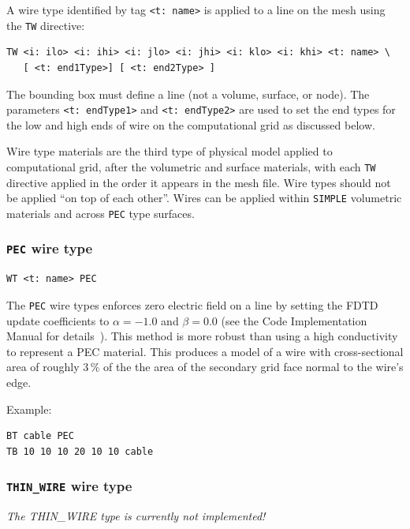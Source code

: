 \documentclass[onecolumn,a4paper]{article}
\numberwithin{equation}{section}
\begin{document}
A wire type identified by tag \texttt{<t:~name>} is applied to a line on the mesh using 
the \texttt{TW} directive:
\begin{verbatim}
TW <i: ilo> <i: ihi> <i: jlo> <i: jhi> <i: klo> <i: khi> <t: name> \
   [ <t: end1Type>] [ <t: end2Type> ]
\end{verbatim}
The bounding box must define a line (not a volume, surface, or node). The parameters 
\texttt{<t:~endType1>} and \texttt{<t:~endType2>} are used to set the end types for the low and 
high ends of wire on the computational grid as discussed below.

Wire type materials are the third type of physical model applied to computational grid, after 
the volumetric and surface materials, with each \texttt{TW} directive applied in the order it appears in 
the mesh file. Wire types should not be applied ``on top of each other''. Wires can be applied within
\texttt{SIMPLE} volumetric materials and across \texttt{PEC} type surfaces. 

\subsubsection{\texttt{PEC} wire type}

\begin{verbatim}
WT <t: name> PEC
\end{verbatim}

The \texttt{PEC} wire types enforces zero electric field on a line
by setting the FDTD update coefficients to $\alpha=-1.0$ and $\beta=0.0$
(see the Code Implementation Manual for details~\cite{vultimp}). This method is more 
robust than using a high conductivity to represent a PEC material. This produces 
a model of a wire with cross-sectional area of roughly 3\,\% of the 
the area of the secondary grid face normal to the wire's edge.

Example:
\begin{verbatim}
BT cable PEC 
TB 10 10 10 20 10 10 cable
\end{verbatim}

\subsubsection{\texttt{THIN\_WIRE} wire type}

{\color{red}\it The THIN\_WIRE type is currently not implemented!\\ \\}
\end{document}
